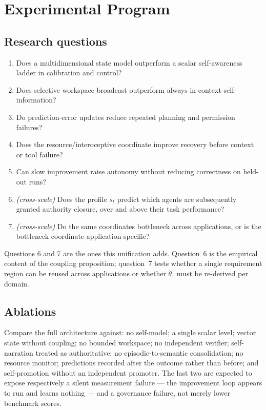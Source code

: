 \documentclass[11pt]{article}
\begin{document}
\section{Experimental Program}
\label{sec:experiments}

\subsection{Research questions}
\begin{enumerate}[leftmargin=1.6em,itemsep=2pt]
\item Does a multidimensional state model outperform a scalar self-awareness ladder in calibration and control?
\item Does selective workspace broadcast outperform always-in-context self-information?
\item Do prediction-error updates reduce repeated planning and permission failures?
\item Does the resource/interoceptive coordinate improve recovery before context or tool failure?
\item Can slow improvement raise autonomy without reducing correctness on held-out runs?
\item \emph{(cross-scale)} Does the profile $s_t$ predict which agents are subsequently granted authority closure, over and above their task performance?
\item \emph{(cross-scale)} Do the same coordinates bottleneck across applications, or is the bottleneck coordinate application-specific?
\end{enumerate}

Questions 6 and 7 are the ones this unification adds. Question~6 is the empirical content of the coupling proposition; question~7 tests whether a single requirement region can be reused across applications or whether $\theta_\tau$ must be re-derived per domain.

\subsection{Ablations}
Compare the full architecture against: no self-model; a single scalar level; vector state without coupling; no bounded workspace; no independent verifier; self-narration treated as authoritative; no episodic-to-semantic consolidation; no resource monitor; predictions recorded after the outcome rather than before; and self-promotion without an independent promoter. The last two are expected to expose respectively a silent measurement failure --- the improvement loop appears to run and learns nothing --- and a governance failure, not merely lower benchmark scores.
\end{document}
